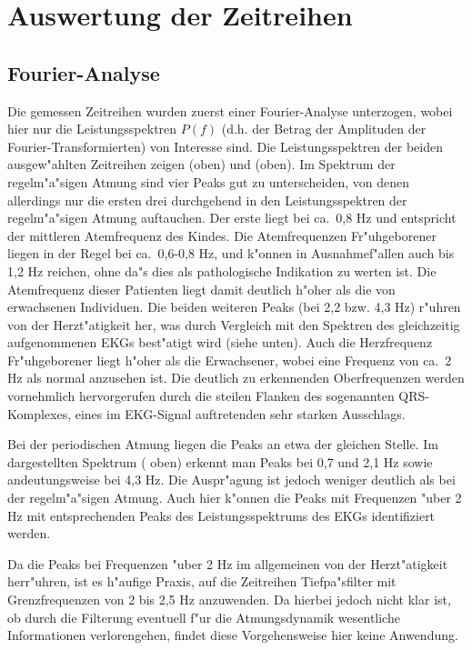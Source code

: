 \section{Auswertung der Zeitreihen} 

\subsection{Fourier-Analyse}
Die gemessen Zeitreihen wurden zuerst einer Fourier-Analyse
unterzogen, wobei hier nur die Leistungsspektren $P(f)$ (d.h. der Betrag der Amplituden der
Fourier-Transfor\-mier\-ten) von Interesse sind. Die Leistungsspektren der beiden
ausgew"ahlten Zeitreihen zeigen  (oben) und 
(oben). Im Spektrum der regelm"a"sigen Atmung sind vier Peaks gut zu unterscheiden, von
denen allerdings nur die ersten drei durchgehend in den Leistungsspektren der
regelm"a"sigen Atmung auftauchen. Der 
erste liegt bei ca.\ 0,8 Hz und entspricht der mittleren Atemfrequenz des Kindes. Die
Atemfrequenzen Fr"uhgeborener liegen in der Regel bei ca.\ 
0,6-0,8 Hz, und k"onnen in Ausnahmef"allen auch bis 1,2 Hz reichen, ohne da"s dies als
pathologische Indikation zu werten ist. Die Atemfrequenz dieser Patienten liegt damit
deutlich h"oher als die von erwachsenen Individuen. Die beiden weiteren Peaks (bei 2,2 bzw. 4,3 Hz)
r"uhren von der Herzt"atigkeit her, was durch Vergleich mit den Spektren des gleichzeitig
aufgenommenen EKGs best"atigt wird (siehe \psref{medfourierr} unten). Auch die Herzfrequenz
Fr"uhgeborener liegt h"oher als die Erwachsener, wobei eine Frequenz von ca.\ 2 Hz als normal
anzusehen ist. Die deutlich zu erkennenden Oberfrequenzen werden vornehmlich hervorgerufen
durch die steilen Flanken des sogenannten QRS-Komplexes, eines im EKG-Signal auftretenden sehr
starken Ausschlags.

Bei der periodischen Atmung liegen die Peaks an etwa der gleichen Stelle. Im dargestellten
Spektrum (\psref{medfourierp} oben) erkennt man Peaks bei 0,7 und 2,1 Hz sowie
andeutungsweise bei 4,3 Hz.  Die Auspr"agung ist jedoch weniger deutlich als bei der
regelm"a"sigen Atmung. Auch hier k"onnen die Peaks mit Frequenzen "uber 2 Hz mit
entsprechenden Peaks des Leistungsspektrums des EKGs identifiziert werden.

Da die Peaks bei Frequenzen "uber 2 Hz im allgemeinen von der Herzt"atigkeit herr"uhren, ist es
h"aufige Praxis, auf die Zeitreihen Tiefpa"sfilter mit Grenzfrequenzen von 2 bis 2,5 Hz
anzuwenden. Da hierbei jedoch nicht klar ist, ob durch die Filterung eventuell f"ur die
Atmungsdynamik wesentliche Informationen verlorengehen, findet diese Vorgehensweise hier
keine Anwendung. 


